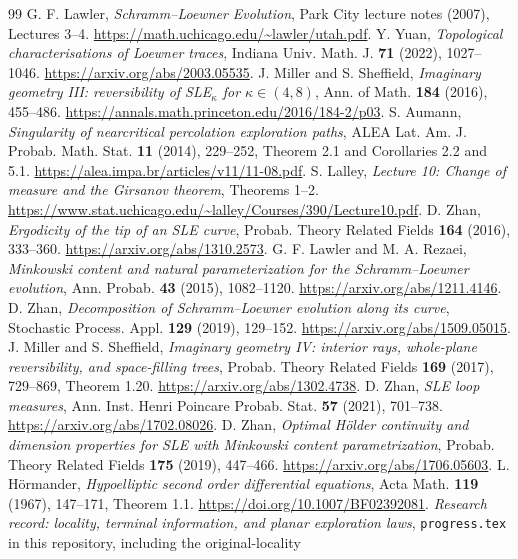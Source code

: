 \documentclass[11pt]{article}
\theoremstyle{definition}\newtheorem{definition}[theorem]{Definition}
\theoremstyle{remark}\newtheorem{remark}[theorem]{Remark}
\begin{document}
\begin{thebibliography}{99}
G. F. Lawler, \emph{Schramm--Loewner Evolution},
Park City lecture notes (2007), Lectures 3--4.
\url{https://math.uchicago.edu/~lawler/utah.pdf}.
Y. Yuan, \emph{Topological characterisations of Loewner traces},
Indiana Univ. Math. J. \textbf{71} (2022), 1027--1046.
\url{https://arxiv.org/abs/2003.05535}.
 J. Miller and S. Sheffield, \emph{Imaginary geometry III:
reversibility of SLE$_\kappa$ for $\kappa\in(4,8)$},
Ann. of Math. \textbf{184} (2016), 455--486.
\url{https://annals.math.princeton.edu/2016/184-2/p03}.
 S. Aumann,
\emph{Singularity of nearcritical percolation exploration paths},
ALEA Lat. Am. J. Probab. Math. Stat. \textbf{11} (2014), 229--252,
Theorem 2.1 and Corollaries 2.2 and 5.1.
\url{https://alea.impa.br/articles/v11/11-08.pdf}.
 S. Lalley,
\emph{Lecture 10: Change of measure and the Girsanov theorem}, Theorems 1--2.
\url{https://www.stat.uchicago.edu/~lalley/Courses/390/Lecture10.pdf}.
 D. Zhan, \emph{Ergodicity of the tip of an SLE curve},
Probab. Theory Related Fields \textbf{164} (2016), 333--360.
\url{https://arxiv.org/abs/1310.2573}.
 G. F. Lawler and M. A. Rezaei,
\emph{Minkowski content and natural parameterization for the
Schramm--Loewner evolution}, Ann. Probab. \textbf{43} (2015), 1082--1120.
\url{https://arxiv.org/abs/1211.4146}.
 D. Zhan,
\emph{Decomposition of Schramm--Loewner evolution along its curve},
Stochastic Process. Appl. \textbf{129} (2019), 129--152.
\url{https://arxiv.org/abs/1509.05015}.
 J. Miller and S. Sheffield,
\emph{Imaginary geometry IV: interior rays, whole-plane reversibility,
and space-filling trees}, Probab. Theory Related Fields \textbf{169}
(2017), 729--869, Theorem 1.20.
\url{https://arxiv.org/abs/1302.4738}.
 D. Zhan, \emph{SLE loop measures},
Ann. Inst. Henri Poincare Probab. Stat. \textbf{57} (2021), 701--738.
\url{https://arxiv.org/abs/1702.08026}.
 D. Zhan,
\emph{Optimal H\"older continuity and dimension properties for SLE with
Minkowski content parametrization}, Probab. Theory Related Fields
\textbf{175} (2019), 447--466.
\url{https://arxiv.org/abs/1706.05603}.
 L. H\"ormander,
\emph{Hypoelliptic second order differential equations},
Acta Math. \textbf{119} (1967), 147--171, Theorem 1.1.
\url{https://doi.org/10.1007/BF02392081}.
\emph{Research record: locality, terminal information, and planar exploration laws},
\texttt{progress.tex} in this repository, including the original-locality

\end{thebibliography}
\end{document}
